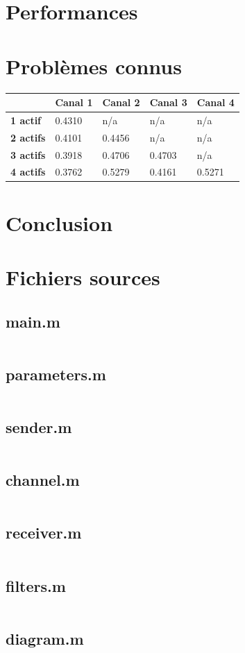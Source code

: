 \documentclass[10pt, oneside, a4paper]{article}
\begin{document}
\section{Performances}


\section{Problèmes connus}

\begin{tabular}{l|llll}
& \bf Canal 1 & \bf Canal 2 & \bf Canal 3 & \bf Canal 4\\
\hline
\bf 1 actif  & 0.4310 & n/a    & n/a    & n/a\\
\bf 2 actifs & 0.4101 & 0.4456 & n/a    & n/a\\
\bf 3 actifs & 0.3918 & 0.4706 & 0.4703 & n/a\\
\bf 4 actifs & 0.3762 & 0.5279 & 0.4161 & 0.5271
\end{tabular}

\section*{Conclusion}

\appendix
\clearpage

\section{Fichiers sources}
\label{sec:fichiers-sources}

\subsection{main.m}
\inputminted{matlab}{../main.m}
\label{app:main}

\subsection{parameters.m}
\inputminted{matlab}{../parameters.m}
\label{app:paremeters}

\subsection{sender.m}
\inputminted{matlab}{../sender.m}
\label{app:sender}

\subsection{channel.m}
\inputminted{matlab}{../channel.m}
\label{app:channel}

\subsection{receiver.m}
\inputminted{matlab}{../receiver.m}
\label{app:receiver}

\subsection{filters.m}
\inputminted{matlab}{../filters.m}
\label{app:filters}

\subsection{diagram.m}
\inputminted{matlab}{../diagram.m}
\label{app:diagram}
\end{document}
